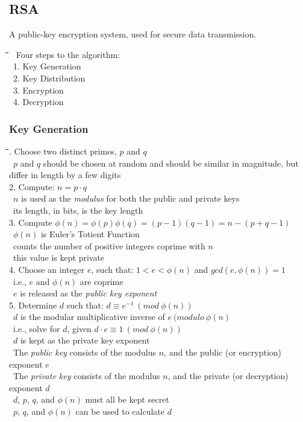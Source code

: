 \documentclass[10pt,letterpaper]{scrartcl}
\newcommand{\tbul}{\textbullet}
\newcommand{\tend}{\>\textendash}
\newcommand{\tasc}{\>\>\textasteriskcentered}
\newcommand{\tabDef}{\hspace{2em}\=\hspace{2em}\=\hspace{2em}\=\hspace{2em}\=\kill}
\begin{document}
\subsection{RSA}
A public-key encryption system, used for secure data transmission. 
\begin{tabbing}\tabDef
	\tbul\ Four steps to the algorithm:\\
	\>\ 1. Key Generation\\
	\>\ 2. Key Distribution\\
	\>\ 3. Encryption \\
	\>\ 4. Decryption\end{tabbing}
	\subsubsection{Key Generation}\begin{tabbing}\tabDef 
	1. Choose two distinct primes, $p$ and $q$ \\
	\tend\ $p$ and $q$ should be chosen at random and should be similar in magnitude, but differ in length by a few digits \\
	2. Compute: $\displaystyle n=p\cdot q$ \\
	\tend\ $n$ is used as the \textit{modulus} for both the public and private keys \\
	\tend\ its length, in bits, is the key length\\
	3. Compute $\displaystyle \phi (n) = \phi (p)\phi (q) = (p-1)(q-1)=n -(p+q-1)$ \\
	\tend\ $\displaystyle \phi (n)$ is Euler's Totient Function \\
	\tasc\ counts the number of positive integers coprime with $n$\\
	\tend\ this value is kept private \\
	4. Choose an integer $e$, such that: $1 < e < \phi (n)$ and $gcd(e, \phi (n))=1$\\
	\tend\ i.e., $e$ and $\phi (n)$ are coprime \\
	\tend\ $e$ is released as the \textit{public key exponent} \\
	5. Determine $d$ such that: $\displaystyle d \equiv e^{-1} \ (mod \ \phi (n))$\\
	\tend\ $d$ is the modular multiplicative inverse of $e \ (modulo \ \phi (n)$\\
	\tend\ i.e., solve for $d$, given $d\cdot e \equiv 1 \ (mod \ \phi (n))$\\
	\tend\ $d$ is kept as the private key exponent \\
	\tbul\ The \textit{public key} consists of the modulus $n$, and the public (or encryption) exponent $e$ \\
	\tbul\ The \textit{private key} consists of the modulus $n$, and the private (or decryption) exponent $d$ \\
	\tbul\ $d$, $p$, $q$, and $\phi (n)$ must all be kept secret \\
	\tend\ $p$, $q$, and $\phi (n)$ can be used to calculate $d$\end{tabbing}
\end{document}
